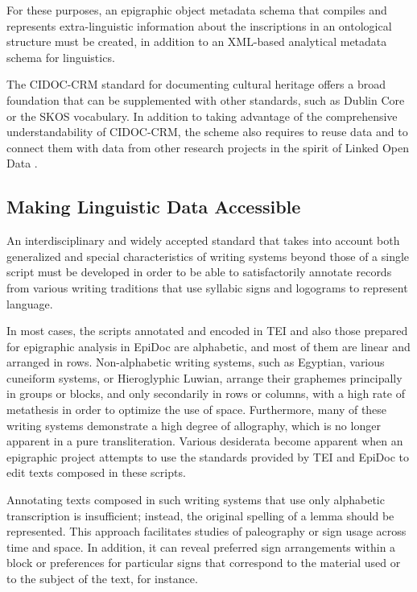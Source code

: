 \documentclass[amsthm,ebook]{saparticle}
\begin{document}
For these purposes, an epigraphic object metadata schema that compiles and represents extra-linguistic information about
the inscriptions in an ontological structure must be created, in addition to an XML-based analytical metadata schema
for linguistics. 

The CIDOC-CRM standard for documenting cultural heritage offers a broad foundation that can be supplemented with other
standards, such as Dublin Core or the SKOS vocabulary. In addition to taking advantage of the comprehensive
understandability of CIDOC-CRM, the scheme also requires to reuse data and to connect them with data from other
research projects in the spirit of Linked Open Data \citep{Diederichs2015, Prager2015}. %

\subsection[Making Linguistic Data Accessible]{Making Linguistic Data Accessible}
\noindent An interdisciplinary and widely accepted standard that takes into account both generalized and special characteristics
of writing systems beyond those of a single script must be developed in order to be able to satisfactorily annotate
records from various writing traditions that use syllabic signs and logograms to represent language.

In most cases, the scripts annotated and encoded in TEI and also those prepared for epigraphic analysis in EpiDoc are
alphabetic, and most of them are linear and arranged in rows. Non-alphabetic writing systems, such as Egyptian, various
cuneiform systems, or Hieroglyphic Luwian, arrange their graphemes principally in groups or blocks, and only
secondarily in rows or columns, with a high rate of metathesis \citep{Lacau1903} in order to optimize the use of space.
Furthermore, many of these writing systems demonstrate a high degree of allography, which is no longer apparent in a
pure transliteration. Various desiderata become apparent when an epigraphic project attempts to use the standards
provided by TEI and EpiDoc to edit texts composed in these scripts. 

Annotating texts composed in such writing systems that use only alphabetic transcription is insufficient; instead, the
original spelling of a lemma should be represented. This approach facilitates studies of paleography or sign usage
across time and space. In addition, it can reveal preferred sign arrangements within a block or preferences for
particular signs that correspond to the material used or to the subject of the text, for instance.
\end{document}

